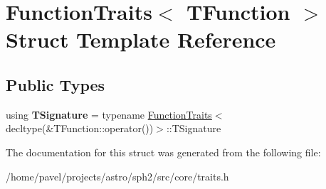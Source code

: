 \hypertarget{structFunctionTraits}{}\section{Function\+Traits$<$ T\+Function $>$ Struct Template Reference}
\label{structFunctionTraits}
\subsection*{Public Types}
\begin{DoxyCompactItemize}
\item 
\hypertarget{structFunctionTraits_a58f8bd16cb255f7d796933ea76fe6f5c}{}\label{structFunctionTraits_a58f8bd16cb255f7d796933ea76fe6f5c} 
using {\bfseries T\+Signature} = typename \hyperlink{structFunctionTraits}{Function\+Traits}$<$ decltype(\&T\+Function\+::operator())$>$\+::T\+Signature
\end{DoxyCompactItemize}


The documentation for this struct was generated from the following file\+:\begin{DoxyCompactItemize}
\item 
/home/pavel/projects/astro/sph2/src/core/traits.\+h\end{DoxyCompactItemize}

